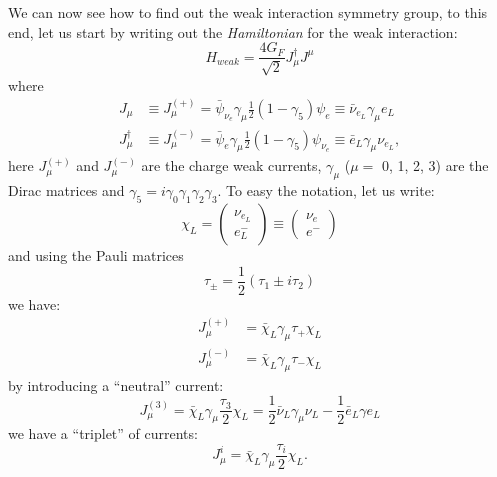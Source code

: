 We can now see how to find out the weak interaction symmetry group, to this end,
let us start by writing out the \emph{Hamiltonian} for the weak interaction:
\begin{equation}
  H_{weak} = \frac{4 G_F}{\sqrt{2}} J_\mu^\dagger J^\mu
\end{equation}
where
\begin{equation}
  \begin{split}
    J_\mu & \equiv J_\mu^{(+)} = \bar{\psi}_{\nu_e} \gamma_\mu \frac{1}{2} (1 -
    \gamma_5) \psi_e \equiv \bar{\nu}_{e_L}
    \gamma_\mu e_L \\
    J_\mu^\dagger & \equiv J_\mu^{(-)} = \bar{\psi}_e \gamma_\mu \frac{1}{2} (1
    - \gamma_5) \psi_{\nu_e} \equiv \bar{e}_L \gamma_\mu \nu_{e_L},
  \end{split}
\end{equation}
here $J_\mu^{(+)}$ and $J_\mu^{(-)}$ are the charge weak currents, $\gamma_\mu$
($\mu =$ 0, 1, 2, 3) are the Dirac matrices and
$\gamma_5 = i \gamma_0 \gamma_1 \gamma_2 \gamma_3$. To easy the notation, let us
write:
\begin{equation}
  \chi_L =
  \begin{pmatrix}
    \nu_{e_L} \\ e^-_L
  \end{pmatrix}
  \equiv
  \begin{pmatrix}
    \nu_e \\ e^-
  \end{pmatrix}
\end{equation}
and using the Pauli matrices
\begin{equation}
  \tau_\pm = \frac{1}{2}( \tau_1 \pm i \tau_2)
\end{equation}
we have:
\begin{equation}
  \begin{split}
    J_\mu^{(+)} &= \bar{\chi}_L \gamma_\mu \tau_+ \chi_L \\
    J_\mu^{(-)} &= \bar{\chi}_L \gamma_\mu \tau_- \chi_L
  \end{split}
\end{equation}
by introducing a ``neutral'' current:
\begin{equation}
  J_\mu^{(3)} = \bar{\chi}_L \gamma_\mu \frac{\tau_3}{2} \chi_L = \frac{1}{2}
  \bar{\nu}_L \gamma_\mu \nu_L - \frac{1}{2} \bar{e}_L \gamma e_L
\end{equation}
we have a ``triplet'' of currents:
\begin{equation}
  \label{eq:1}
  J_\mu^i = \bar{\chi}_L \gamma_\mu \frac{\tau_i}{2} \chi_L.
\end{equation}

